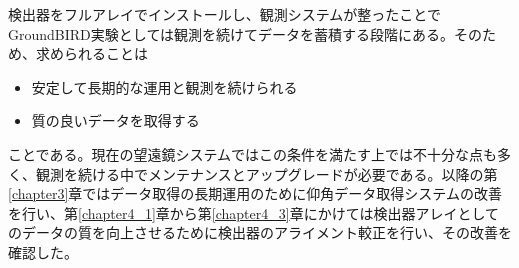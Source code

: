 検出器をフルアレイでインストールし、観測システムが整ったことでGroundBIRD実験としては観測を続けてデータを蓄積する段階にある。そのため、求められることは
\begin{itemize}
  \item 安定して長期的な運用と観測を続けられる
  \item 質の良いデータを取得する
\end{itemize}
ことである。現在の望遠鏡システムではこの条件を満たす上では不十分な点も多く、観測を続ける中でメンテナンスとアップグレードが必要である。以降の第\ref{chapter3}章ではデータ取得の長期運用のために仰角データ取得システムの改善を行い、第\ref{chapter4_1}章から第\ref{chapter4_3}章にかけては検出器アレイとしてのデータの質を向上させるために検出器のアライメント較正を行い、その改善を確認した。


